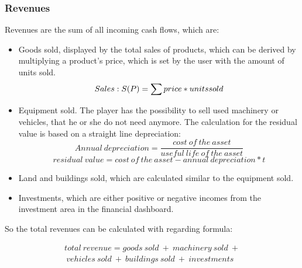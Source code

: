 \subsubsection{Revenues}
Revenues are the sum of all incoming cash flows, which are:
\begin{itemize}
    \item Goods sold, displayed by the total sales of products, which can be derived by multiplying a product’s price, which is set by the user with the amount of units sold.
    \begin{equation}
        Sales: S(P) = \sum price\index{Product} * units sold
    \end{equation}
    \item Equipment sold. The player has the possibility to sell used machinery or vehicles, that he or she do not need anymore. The calculation for the residual value is based on a straight line depreciation:
     \begin{equation}
     Annual \ depreciation = {\dfrac{cost \ of \ the \ asset}{useful \ life \ of \ the \ asset}}
    \end{equation}
     \begin{equation}
     residual \ value = {{cost \ of \ the \ asset} - {annual \ depreciation * t }}    
     \end{equation}
    
    \item Land and buildings sold, which are calculated similar to the equipment sold.
  
    \item Investments, which are either positive or negative incomes from the investment area in the financial dashboard.
\end{itemize}

So the total revenues can be calculated with regarding formula:

\begin{equation}
\begin{split}
    total \ revenue = goods \ sold \ + \ machinery \ sold \ + \\\ vehicles \ sold \  + \ buildings \ sold \ + \ investments   
\end{split}
\end{equation}


